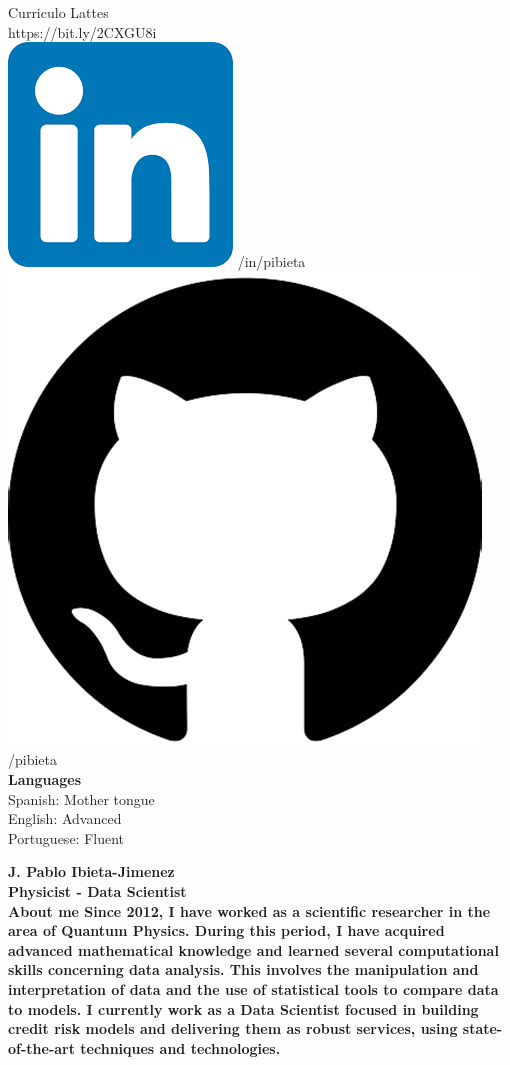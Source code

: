 \documentclass[a4paper,12pt,final]{memoir}
\newcommand{\Sep}{\vspace{1.5em}}
\newenvironment{AboutMe}
	{\ignorespaces\textbf{\color{RoyalBlue} About me}}
	{\Sep\ignorespacesafterend}
\begin{document}
\begin{flushleft}
	\vspace{1mm}
	Curriculo Lattes \\
	\vspace{1mm}
	https://bit.ly/2CXGU8i\\
	\vspace{1mm}
    \includegraphics[width=0.07\columnwidth]{in_icon.png} /in/pibieta \\
    \vspace{1mm}
    \includegraphics[width=0.07\columnwidth]{git.jpeg} /pibieta \\
    \vspace{1mm}
    \vspace{4mm}
	\textbf{Languages}\\
	\vspace{1mm}
	Spanish: Mother tongue\\
	\vspace{1mm}
	English: Advanced\\
	\vspace{1mm}
	Portuguese: Fluent
\end{flushleft}\normalsize


\framebreak



\Huge\bfseries {\color{RoyalBlue} J. Pablo Ibieta-Jimenez} \\
\Large\bfseries Physicist - Data Scientist\\

\normalsize\normalfont
\vspace{-10pt} 
\begin{AboutMe}
Since 2012, I have worked as a scientific researcher in the area of Quantum Physics. During this period, I have acquired advanced mathematical knowledge and learned several computational skills concerning data analysis. This involves the manipulation and interpretation of data and the use of statistical tools to compare data to models. I currently work as a Data Scientist focused in building credit risk models and delivering them as robust services, using state-of-the-art techniques and technologies.
\end{AboutMe}
\end{document}
